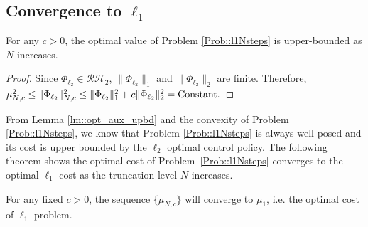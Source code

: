 \subsection{Convergence to \(\ell_1\)}
\begin{lemma}\label{lm::opt_aux_upbd}
For any \(c>0\), the optimal value of Problem \ref{Prob::l1Nsteps} is upper-bounded as \(N\) increases.
\end{lemma}
\begin{proof}
Since \(\Phi_{\ell_2}\in\mathcal{RH}_2\), \(\|\Phi_{\ell_2}\|_1\) and \(\|\Phi_{\ell_2}\|_2\) are finite. Therefore,
\(\mu_{N,c}^2 \leq \|\Phi_{\ell_2}\|_{N,c}^2 \leq \|\Phi_{\ell_2}\|_1^2 +c  \|\Phi_{\ell_2}\|_2^2 = \rm{Constant}.\)
\end{proof}

From Lemma \ref{lm::opt_aux_upbd} and the convexity of Problem \ref{Prob::l1Nsteps}, we know that Problem \ref{Prob::l1Nsteps} is always well-posed and its cost is upper bounded by the \(\ell_2\) optimal control policy. 
The following theorem shows the optimal cost of Problem~\ref{Prob::l1Nsteps} converges to the optimal \(\ell_1\) cost as the truncation level \(N\) increases.
\begin{thm}\label{thm:auxconverge}
For any fixed \(c>0\), the sequence \(\{\mu_{N,c}\}\) will converge to \(\mu_1\), i.e. the optimal cost of \(\ell_1\) problem.
\end{thm}
